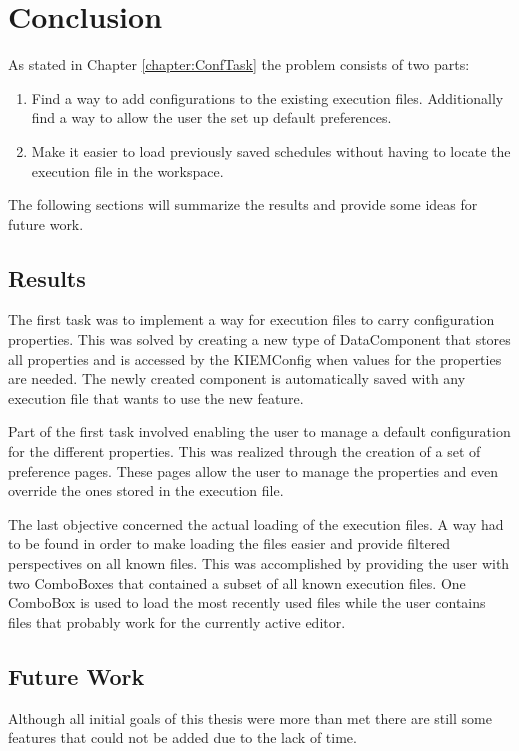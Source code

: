 \chapter{Conclusion}
\label{chapter:ConfConclusion}
As stated in Chapter \ref{chapter:ConfTask} the problem consists of two parts:
\begin{enumerate}
 \item Find a way to add configurations to the existing execution files. Additionally find
a way to allow the user the set up default preferences.
 \item Make it easier to load previously saved schedules without having to locate
the execution file in the workspace.
\end{enumerate}
The following sections will summarize the results and provide some ideas for
future work.

\section{Results}
The first task was to implement a way for execution files to carry configuration
properties. This was solved by creating a new type of DataComponent that stores all
properties and is accessed by the \ac{KIEMConfig} when values for the properties are needed.
The newly created component is automatically saved with any execution file that wants to
use the new feature.

Part of the first task involved enabling the user to manage a default configuration
for the different properties. This was realized through the creation of a set
of preference pages. These pages allow the user to manage the properties and even
override the ones stored in the execution file.

The last objective concerned the actual loading of the execution files. A way had to be
found in order to make loading the files easier and provide filtered perspectives on all known
files. This was accomplished by providing the user with two ComboBoxes that contained a
subset of all known execution files. One ComboBox is used to load the most recently used files
while the user contains files that probably work for the currently active editor.

\section{Future Work}
Although all initial goals of this thesis were more than met there are still
some features that could not be added due to the lack of time.
